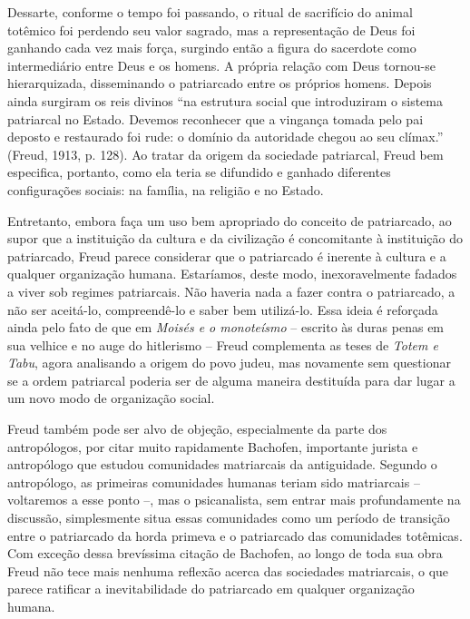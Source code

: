 Dessarte, conforme o tempo foi passando, o ritual de sacrifício do
animal totêmico foi perdendo seu valor sagrado, mas a representação de
Deus foi ganhando cada vez mais força, surgindo então a figura do
sacerdote como intermediário entre Deus e os homens. A própria relação
com Deus tornou-se hierarquizada, disseminando o patriarcado entre os
próprios homens. Depois ainda surgiram os reis divinos ``na estrutura
social que introduziram o sistema patriarcal no Estado. Devemos
reconhecer que a vingança tomada pelo pai deposto e restaurado foi rude:
o domínio da autoridade chegou ao seu clímax.'' (Freud, 1913, p. 128).
Ao tratar da origem da sociedade patriarcal, Freud bem especifica,
portanto, como ela teria se difundido e ganhado diferentes configurações
sociais: na família, na religião e no Estado.

Entretanto, embora faça um uso bem apropriado do conceito de
patriarcado, ao supor que a instituição da cultura e da civilização é
concomitante à instituição do patriarcado, Freud parece considerar que o
patriarcado é inerente à cultura e a qualquer organização humana.
Estaríamos, deste modo, inexoravelmente fadados a viver sob regimes
patriarcais. Não haveria nada a fazer contra o patriarcado, a não ser
aceitá-lo, compreendê-lo e saber bem utilizá-lo. Essa ideia é reforçada
ainda pelo fato de que em \emph{Moisés e o monoteísmo} -- escrito às
duras penas em sua velhice e no auge do hitlerismo -- Freud complementa
as teses de \emph{Totem e Tabu}, agora analisando a origem do povo
judeu, mas novamente sem questionar se a ordem patriarcal poderia ser de
alguma maneira destituída para dar lugar a um novo modo de organização
social.

Freud também pode ser alvo de objeção, especialmente da parte dos
antropólogos, por citar muito rapidamente Bachofen, importante jurista e
antropólogo que estudou comunidades matriarcais da antiguidade. Segundo
o antropólogo, as primeiras comunidades humanas teriam sido matriarcais
-- voltaremos a esse ponto --, mas o psicanalista, sem entrar mais
profundamente na discussão, simplesmente situa essas comunidades como um
período de transição entre o patriarcado da horda primeva e o
patriarcado das comunidades totêmicas. Com exceção dessa brevíssima
citação de Bachofen, ao longo de toda sua obra Freud não tece mais
nenhuma reflexão acerca das sociedades matriarcais, o que parece
ratificar a inevitabilidade do patriarcado em qualquer organização
humana.

